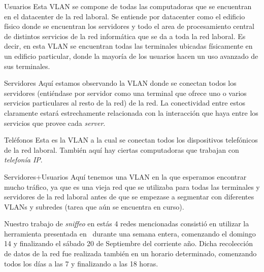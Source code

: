     \begin{LaTeXdescription}
        \item[Usuarios\label{itm:vlan10}]
            Esta VLAN se compone de todas las computadoras que se
            encuentran en el datacenter de la red laboral. Se entiende por
            datacenter como el edificio f\'isico donde se encuentran los servidores
            y todo el area de procesamiento central de distintos servicios de la
            red inform\'atica que se da a toda la red laboral. Es decir, en esta
            VLAN se encuentran todas las terminales ubicadas f\'isicamente en un
            edificio particular, donde la mayor\'ia de los usuarios hacen un uso
            avanzado de sus terminales.\\

        \item[Servidores\label{itm:vlan20}]
            Aqu\'i estamos observando la VLAN donde se conectan todos
            los servidores (enti\'endase por servidor como una terminal que ofrece
            uno o varios servicios particulares al resto de la red) de la red. La
            conectividad entre estos claramente estar\'a estrechamente relacionada
            con la interacci\'on que haya entre los servicios que provee cada
            \textit{server}.\\

        \item[Tel\'efonos\label{itm:vlan40}]
            Esta es la VLAN a la cual se conectan todos los
            dispositivos telef\'onicos de la red laboral. Tambi\'en aqu\'i hay
            ciertas computadoras que trabajan con \textit{telefon\'ia IP}.\\

        \item[Servidores+Usuarios\label{itm:vlan1}]
            Aqu\'i tenemos una VLAN en la que
            esperamos encontrar mucho tr\'afico, ya que es una vieja red que se
            utilizaba para todas las terminales y servidores de la red laboral antes
            de que se empezase a segmentar con diferentes VLANs y subredes (tarea que
            a\'un se encuentra en curso).\\

    \end{LaTeXdescription}

    \par Nuestro trabajo de \textit{sniffeo} en est\'as 4 redes mencionadas consisti\'o
    en utilizar la herramienta presentada en~ durante una semana entera,
    comenzando el domingo 14 y finalizando el s\'abado 20 de Septiembre del corriente a\~no.
    Dicha recolecci\'on de datos de la red fue realizada tambi\'en en un horario determinado,
    comenzando todos los d\'ias a las 7 y finalizando a las 18 horas.

